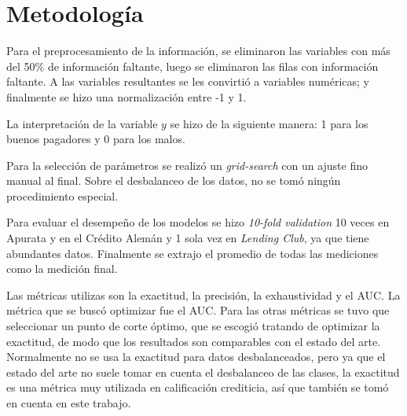 \section{Metodología}

Para el preprocesamiento de la información, se eliminaron las variables con más del 50\% de información faltante, luego se eliminaron las filas con información faltante. A las variables resultantes se les convirtió a variables numéricas; y finalmente se hizo una normalización entre -1 y 1.

La interpretación de la variable $y$ se hizo de la siguiente manera: 1 para los buenos pagadores y 0 para los malos.

Para la selección de parámetros se realizó un \textit{grid-search} con un ajuste fino manual al final. Sobre el desbalanceo de los datos, no se tomó ningún procedimiento especial.

Para evaluar el desempeño de los modelos se hizo \textit{10-fold validation} 10 veces en Apurata y en el Crédito Alemán y 1 sola vez en \textit{Lending Club}, ya que tiene abundantes datos. Finalmente se extrajo el promedio de todas las mediciones como la medición final.

Las métricas utilizas son la exactitud, la precisión, la exhaustividad y el \ac{AUC}. La métrica que se buscó optimizar fue el \ac{AUC}. Para las otras métricas se tuvo que seleccionar un punto de corte óptimo, que se escogió tratando de optimizar la exactitud, de modo que los resultados son comparables con el estado del arte. Normalmente no se usa la exactitud para datos desbalanceados, pero ya que el estado del arte no suele tomar en cuenta el desbalanceo de las clases, la exactitud es una métrica muy utilizada en calificación crediticia, así que también se tomó en cuenta en este trabajo.


